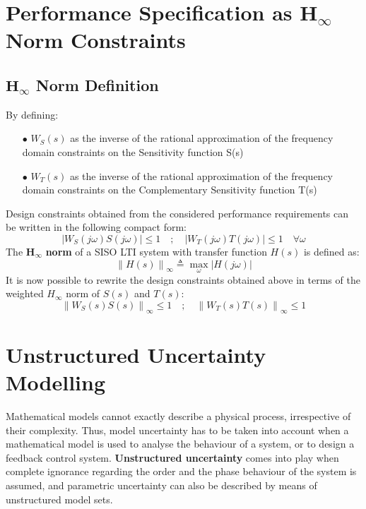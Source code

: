 \documentclass[a4paper,10pt,titlepage]{article}
\numberwithin{equation}{subsection}
\begin{document}
	\section{Performance Specification as $\bm{H_\infty}$ Norm Constraints}
	\subsection{$\bm{H_\infty}$ Norm Definition}
	By defining:
	\begin{enumerate}
		\item[$\bullet$] $W_S(s)$ as the inverse of the rational approximation of the frequency domain constraints on the Sensitivity function S(s)
		\item[$\bullet$] $W_T(s)$ as the inverse of the rational approximation of the frequency domain constraints on the Complementary Sensitivity function T(s)
	\end{enumerate}
	Design constraints obtained from the considered performance requirements can be written in the following compact form:
	\begin{equation}
		\left| W_S(j\omega)S(j\omega) \right| \leq 1 \quad ; \quad \left| W_T(j\omega)T(j\omega) \right| \leq 1 \quad \forall\omega	
	\end{equation}
	The $\bm{H_\infty}$ \textbf{norm} of a SISO LTI system with transfer function $H(s)$ is defined as:
	\begin{equation}
		\left\lVert H(s) \right\rVert_\infty \triangleq \max_\omega \left| H(j\omega) \right|
	\end{equation}
	It is now possible to rewrite the design constraints obtained above in terms of the weighted $H_\infty$ norm of $S(s)$ and $T(s)$:
	\begin{equation}
		\left\lVert W_S(s)S(s) \right\rVert_\infty \leq 1 \quad ; \quad \left\lVert W_T(s)T(s) \right\rVert_\infty \leq 1
	\end{equation}

	\section{Unstructured Uncertainty Modelling}
	Mathematical models cannot exactly describe a physical process, irrespective of their complexity. Thus, model uncertainty has to be taken into account when a mathematical model is used to analyse the behaviour of a system, or to design a feedback control system.
	\textbf{Unstructured uncertainty} comes into play when complete ignorance regarding the order and the phase behaviour of the system is assumed, and parametric uncertainty can also be described by means of unstructured model sets.
\end{document}
